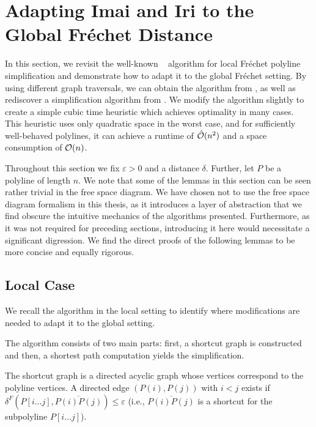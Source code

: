 \section{Adapting Imai and Iri to the Global Fréchet Distance}
\label{sec:global_imai_iri}

In this section, we revisit the well-known \citeauthor{computational_geometric_methods_for_polygonal_approximations_of_a_curve}~\cite{computational_geometric_methods_for_polygonal_approximations_of_a_curve} algorithm for local Fréchet polyline simplification and demonstrate how to adapt it to the global Fréchet setting. By using different graph traversals, we can obtain the algorithm from \citeauthor{on_optimal_polyline_simplification_using_the_hausdorff_and_frechet_distance}, as well as rediscover a simplification algorithm from \citeauthor{global_curve_simplification}. We modify the algorithm slightly to create a simple cubic time heuristic which achieves optimality in many cases. This heuristic uses only quadratic space in the worst case, and for sufficiently well-behaved polylines, it can achieve a runtime of \(\hat{\mathcal{O}}(n^2)\) and a space consumption of \(\mathcal{O}(n)\).

Throughout this section we fix \(\varepsilon > 0\) and a distance \(\delta\). Further, let \(P\) be a polyline of length \(n\). We note that some of the lemmas in this section can be seen rather trivial in the free space diagram. We have chosen not to use the free space diagram formalism in this thesis, as it introduces a layer of abstraction that we find obscure the intuitive mechanics of the algorithms presented. Furthermore, as it was not required for preceding sections, introducing it here would necessitate a significant digression. We find the direct proofs of the following lemmas to be more concise and equally rigorous.

\subsection{Local Case}

We recall the algorithm in the local setting to identify where modifications are needed to adapt it to the global setting. 

The algorithm consists of two main parts: first, a shortcut graph is constructed and then, a shortest path computation yields the simplification.

The shortcut graph is a directed acyclic graph whose vertices correspond to the polyline vertices. A directed edge \((P(i), P(j))\) with \(i < j\) exists if \(\delta^F(P[i \dots j], \overline{P(i)P(j)}) \leq \varepsilon\) (i.e., \(\overline{P(i)P(j)}\) is a shortcut for the subpolyline \(P[i \dots j]\)). 

